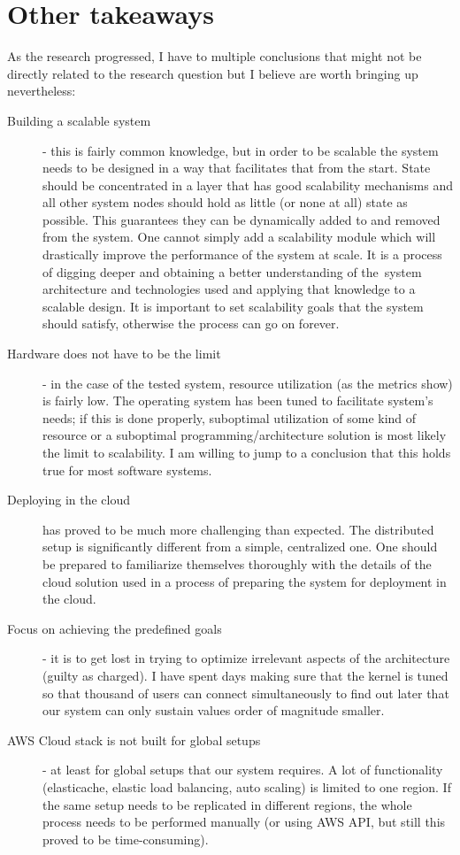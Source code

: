 \documentclass{uvamscse}
\begin{document}
\section{Other takeaways}
As the research progressed, I have to multiple conclusions that might not be directly related to the research question but I believe are worth bringing up nevertheless:
\begin{description}
  \item[Building a scalable system] - this is fairly common knowledge, but in order to be scalable the system needs to be designed in a way that facilitates that from the start. State should be concentrated in a layer that has good scalability mechanisms and all other system nodes should hold as little (or none at all) state as possible. This guarantees they can be dynamically added to and removed from the system. One cannot simply add a scalability module which will drastically improve the performance of the system at scale. It is a process of digging deeper and obtaining a better understanding of the system architecture and technologies used and applying that knowledge to a scalable design. It is important to set scalability goals that the system should satisfy, otherwise the process can go on forever.
  \item[Hardware does not have to be the limit] - in the case of the tested system, resource utilization (as the metrics show) is fairly low. The operating system has been tuned to facilitate system's needs; if this is done properly, suboptimal utilization of some kind of resource or a suboptimal programming/architecture solution is most likely the limit to scalability. I am willing to jump to a conclusion that this holds true for most software systems.
  \item[Deploying in the cloud] has proved to be much more challenging than expected. The distributed setup is significantly different from a simple, centralized one. One should be prepared to familiarize themselves thoroughly with the details of the cloud solution used in a process of preparing the system for deployment in the cloud.
  \item[Focus on achieving the predefined goals] - it is to get lost in trying to optimize irrelevant aspects of the architecture (guilty as charged). I have spent days making sure that the kernel is tuned so that thousand of users can connect simultaneously to find out later that our system can only sustain values order of magnitude smaller.
  \item[AWS Cloud stack is not built for global setups] - at least for global setups that our system requires. A lot of functionality (elasticache, elastic load balancing, auto scaling) is limited to one region. If the same setup needs to be replicated in different regions, the whole process needs to be performed manually (or using AWS API, but still this proved to be time-consuming).

\end{description}
\end{document}

